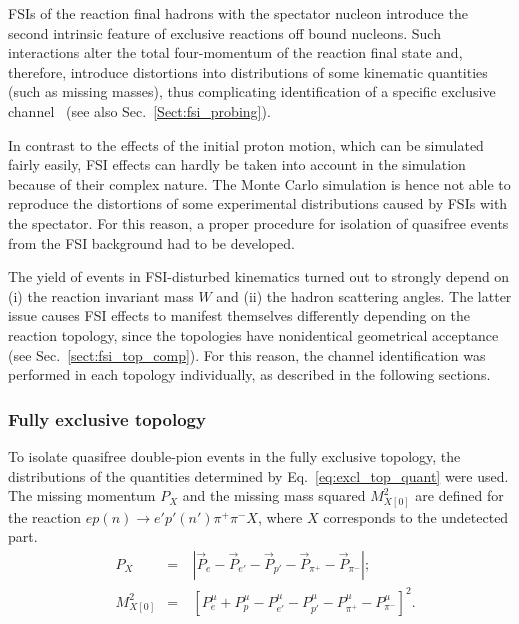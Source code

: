 \documentclass[prc,twocolumn,superscriptaddress,showpacs,amssymb,amsmath,amsfonts,aps,nofootinbib]{revtex4-1}
\begin{document}
FSIs of the reaction final hadrons with the spectator nucleon introduce the second intrinsic feature of exclusive reactions off bound nucleons. Such interactions alter the total four-momentum of the reaction final state and, therefore, introduce distortions into distributions of some kinematic quantities (such as missing masses), thus complicating identification of a specific exclusive channel~\cite{note_mm_distr} (see also Sec.\!~\ref{Sect:fsi_probing}).


In contrast to the effects of the initial proton motion, which can be simulated fairly easily, FSI effects can hardly be taken into account in the simulation because of their complex nature. The Monte Carlo simulation is hence not able to reproduce the distortions of some experimental distributions caused by FSIs with the spectator. For this reason, a proper procedure for isolation of quasifree events from the FSI background had to be developed.


The yield of events in FSI-disturbed kinematics turned out to strongly depend on (i) the reaction invariant mass $W$ and (ii) the hadron scattering angles. The latter issue causes FSI effects to manifest themselves differently depending on the reaction topology, since the topologies have nonidentical geometrical acceptance (see Sec.\!~\ref{sect:fsi_top_comp}). For this reason, the channel identification was performed in each topology individually, as described in the following sections. 



\subsubsection{Fully exclusive topology}
\label{Sect:excl_cut_fully_excl}


To isolate quasifree double-pion events in the fully exclusive topology, the distributions of the quantities determined by Eq.\!~\eqref{eq:excl_top_quant} were used. The missing momentum $P_{X}$ and the missing mass squared $M^{2}_{X[0]}$ are defined for the reaction $ep(n)\rightarrow e'p'(n')\pi^{+}\pi^{-}X$, where $X$ corresponds to the undetected part.
\begin{equation}
\begin{aligned}
&P_{X}&=&~|\overrightarrow{P}_{e} - \overrightarrow{P}_{e'}- \overrightarrow{P}_{p'} - \overrightarrow{P}_{\pi^{+}} - \overrightarrow{P}_{\pi^{-}}|;\\[-2pt]
&M_{X[0]}^{2}&=&~[P_{e}^{\mu} + P_{p}^{\mu}- P_{e'}^{\mu}- P_{p'}^{\mu}-  P_{\pi^{+}}^{\mu} - P_{\pi^{-}}^{\mu}]^{2}.\\[-2pt]
\end{aligned}\label{eq:excl_top_quant}
\end{equation}
\end{document}
